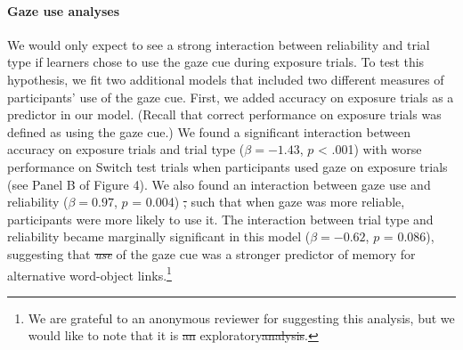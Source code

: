\documentclass[authoryear, review]{elsarticle}
\providecommand{\DIFaddtex}[1]{{\protect\color{blue}\uwave{#1}}} %
\providecommand{\DIFdeltex}[1]{{\protect\color{red}\sout{#1}}}                      %
\providecommand{\DIFaddbegin}{} %
\providecommand{\DIFaddend}{} %
\providecommand{\DIFdelbegin}{} %
\providecommand{\DIFdelend}{} %
\providecommand{\DIFadd}[1]{\texorpdfstring{\DIFaddtex{#1}}{#1}} %
\providecommand{\DIFdel}[1]{\texorpdfstring{\DIFdeltex{#1}}{}} %
\begin{document}
\paragraph{Gaze use analyses}\label{gaze-use-analyses}

We would only expect to see a strong interaction between reliability and
trial type if learners chose to use the gaze cue during exposure trials.
To test this hypothesis, we fit two additional models that included two
different measures of participants' use of the gaze cue. First, we added
accuracy on exposure trials as a predictor in our model. (Recall that
correct performance on exposure trials was defined as using the gaze
cue.) We found a significant interaction between accuracy on exposure
trials and trial type (\(\beta = -1.43\), \(p\) \textless{} .001) with
worse performance on Switch test trials when participants used gaze on
exposure trials (see Panel B of Figure 4). We also found an interaction
between gaze use and reliability (\(\beta = 0.97\), \(p\) = 0.004) \DIFdelbegin \DIFdel{, }\DIFdelend such
that when gaze was more reliable, participants were more likely to use
it. The interaction between trial type and reliability became marginally
significant in this model (\(\beta = -0.62\), \(p\) = 0.086), suggesting
that \DIFdelbegin \emph{\DIFdel{use}} %
\DIFdelend \DIFaddbegin \DIFadd{participants' use }\DIFaddend of the gaze cue was a stronger predictor of
memory for alternative word-object links.\footnote{We are grateful to an
  anonymous reviewer for suggesting this analysis, but we would like to
  note that it is \DIFdelbegin \DIFdel{an }\DIFdelend exploratory\DIFdelbegin \DIFdel{analysis}\DIFdelend .}
\end{document}
